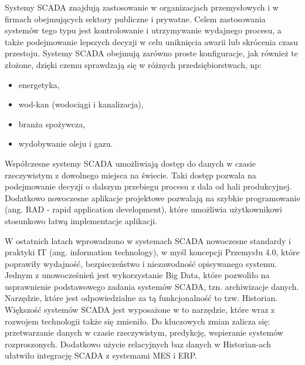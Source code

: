 Systemy SCADA znajdują zastosowanie w organizacjach przemysłowych i w firmach obejmujących sektory publiczne i prywatne. Celem zastosowania systemów tego typu jest kontrolowanie i utrzymywanie wydajnego procesu, a także podejmowanie lepszych decyzji w celu uniknięcia awarii lub skrócenia czasu przestoju. Systemy SCADA obejmują zarówno proste konfiguracje, jak również te złożone, dzięki czemu sprawdzają się w różnych przedsiębiorstwach, np:

\begin{itemize}
	\item energetyka,
	\item wod-kan (wodociągi i kanalizacja),
	\item branża spożywcza,
	\item wydobywanie oleju i gazu. 
\end{itemize}





Współczesne systemy SCADA umożliwiają dostęp do danych w czasie rzeczywistym z dowolnego miejsca na świecie. Taki dostęp pozwala na podejmowanie decyzji o dalszym przebiegu procesu z dala od hali produkcyjnej. Dodatkowo nowoczesne aplikacje projektowe pozwalają na szybkie programowanie (ang. RAD - rapid application development), które umożliwia użytkownikowi stosunkowo łatwą implementacje aplikacji.


W ostatnich latach wprowadzono w systemach SCADA nowoczesne standardy i praktyki IT (ang. information technology), w myśl koncepcji Przemysłu 4.0, które poprawiły wydajność, bezpieczeństwo i niezawodność opisywanego systemu. Jednym z unowocześnień jest wykorzystanie Big Data, które pozwoliło na usprawnienie podstawowego zadania systemów SCADA, tzn. archiwizacje danych. Narzędzie, które jest odpowiedzialne za tą funkcjonalność to tzw. Historian. Większość systemów SCADA jest wyposażone w to narzędzie, które wraz z rozwojem technologii także się zmieniło. Do kluczowych zmian zalicza się: przetwarzanie danych w czasie rzeczywistym, predykcję, wspieranie systemów rozproszonych. Dodatkowo użycie relacyjnych baz danych w Historian-ach ułatwiło integrację SCADA z systemami MES i ERP. 

